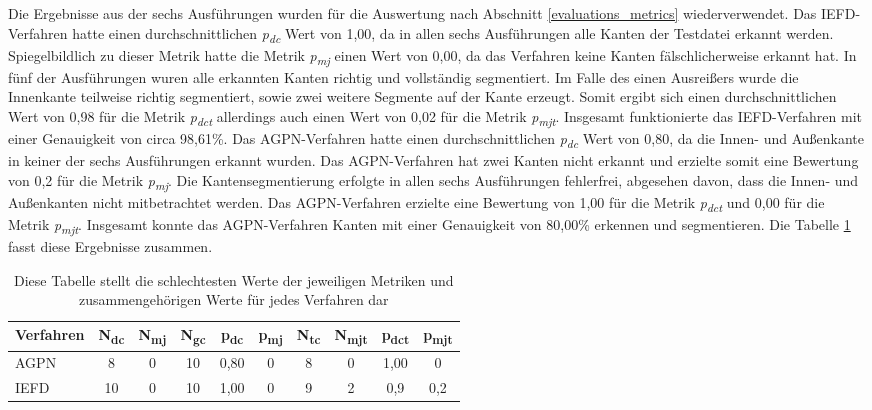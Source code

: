 Die Ergebnisse aus der sechs Ausführungen wurden für die Auswertung nach Abschnitt \ref{evaluations_metrics} wiederverwendet. Das IEFD-Verfahren hatte einen durchschnittlichen \textit{p\textsubscript{dc}} Wert von 1,00, da in allen sechs Ausführungen alle Kanten der Testdatei erkannt werden. Spiegelbildlich zu dieser Metrik hatte die Metrik \textit{p\textsubscript{mj}} einen Wert von 0,00, da das Verfahren keine Kanten fälschlicherweise erkannt hat. In fünf der Ausführungen wuren alle erkannten Kanten richtig und vollständig segmentiert. Im Falle des einen Ausreißers wurde die Innenkante teilweise richtig segmentiert, sowie zwei weitere Segmente auf der Kante erzeugt. Somit ergibt sich einen durchschnittlichen Wert von 0,98 für die Metrik \textit{p\textsubscript{dct}} allerdings auch einen Wert von 0,02 für die Metrik \textit{p\textsubscript{mjt}}. Insgesamt funktionierte das IEFD-Verfahren mit einer Genauigkeit von circa 98,61\%. Das AGPN-Verfahren hatte einen durchschnittlichen \textit{p\textsubscript{dc}} Wert von 0,80, da die Innen- und Außenkante in keiner der sechs Ausführungen erkannt wurden. Das AGPN-Verfahren hat zwei Kanten nicht erkannt und erzielte somit eine Bewertung von 0,2 für die Metrik \textit{p\textsubscript{mj}}. Die Kantensegmentierung erfolgte in allen sechs Ausführungen fehlerfrei, abgesehen davon, dass die Innen- und Außenkanten nicht mitbetrachtet werden. Das AGPN-Verfahren erzielte eine Bewertung von 1,00 für die Metrik \textit{p\textsubscript{dct}} und 0,00 für die Metrik \textit{p\textsubscript{mjt}}. Insgesamt konnte das AGPN-Verfahren Kanten mit einer Genauigkeit von 80,00\% erkennen und segmentieren. Die Tabelle \ref{table: metric_values} fasst diese Ergebnisse zusammen.

\begin{table}[h]
	\centering
	\begin{tabular}{l *{9}{c}}
		\hline
		\textbf{Verfahren} & \textbf{N\textsubscript{dc}} & \textbf{N\textsubscript{mj}} & \textbf{N\textsubscript{gc}} & \textbf{p\textsubscript{dc}} & \textbf{p\textsubscript{mj}} & \textbf{N\textsubscript{tc}} & \textbf{N\textsubscript{mjt}} & \textbf{p\textsubscript{dct}} & \textbf{p\textsubscript{mjt}} \\
		\hline
		AGPN & 8 & 0 & 10 & 0,80 & 0 & 8 & 0 & 1,00 & 0 \\
		IEFD & 10 & 0 & 10 & 1,00 & 0 & 9 & 2 & 0,9 & 0,2 \\
		\hline
	\end{tabular}
	\caption{Diese Tabelle stellt die schlechtesten Werte der jeweiligen Metriken und zusammengehörigen Werte für jedes Verfahren dar}
	\label{table: metric_values}
\end{table}

